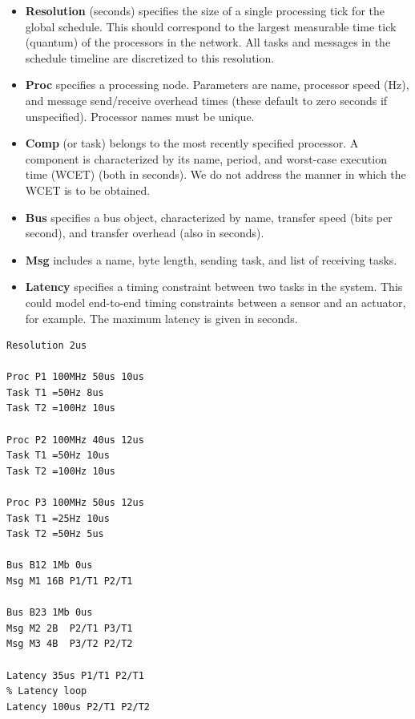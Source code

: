 \begin{itemize}
\item {\bf Resolution} (seconds) specifies the size of a single processing tick for the global schedule.  This should correspond to the largest measurable time tick (quantum) of the processors in the network.  All tasks and messages in the schedule timeline are discretized to this resolution.
\item {\bf Proc} specifies a processing node.  Parameters are name, processor speed (Hz), and message send/receive overhead times (these default to zero seconds if unspecified).  Processor names must be unique.
\item {\bf Comp} (or task) belongs to the most recently specified processor.  A component is characterized by its name, period, and worst-case execution time (WCET) (both in seconds).  We do not address the manner in which the WCET is to be obtained.
\item {\bf Bus} specifies a bus object, characterized by name, transfer speed (bits per second), and transfer overhead (also in seconds).
\item {\bf Msg} includes a name, byte length, sending task, and list of receiving tasks.
\item {\bf Latency} specifies a timing constraint between two tasks in the system.  This could model end-to-end timing constraints between a sensor and an actuator, for example.  The maximum latency is given in seconds.
\end{itemize}

\begin{framed}
\lstset{basicstyle=\small,frame=none,label=schedspec,caption=Scheduling problem specification.}

\begin{lstlisting}
Resolution 2us

Proc P1 100MHz 50us 10us
Task T1 =50Hz 8us
Task T2 =100Hz 10us

Proc P2 100MHz 40us 12us
Task T1 =50Hz 10us
Task T2 =100Hz 10us

Proc P3 100MHz 50us 12us
Task T1 =25Hz 10us
Task T2 =50Hz 5us

Bus B12 1Mb 0us
Msg M1 16B P1/T1 P2/T1

Bus B23 1Mb 0us
Msg M2 2B  P2/T1 P3/T1
Msg M3 4B  P3/T2 P2/T2

Latency 35us P1/T1 P2/T1
% Latency loop
Latency 100us P2/T1 P2/T2
\end{lstlisting}
\end{framed}

